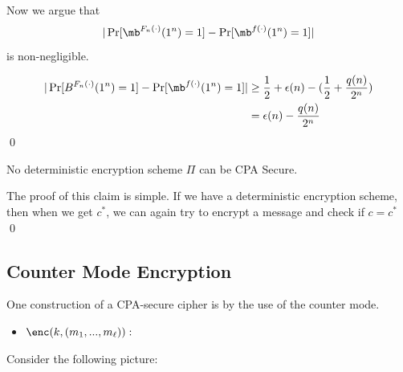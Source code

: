 Now we argue that 
$$|\Pr[\mb^{F_n(\cdot)}(1^n) = 1] - \Pr[\mb^{f(\cdot)}(1^n) = 1]|$$
is non-negligible.

\begin{align*}
    |\Pr[B^{F_n(\cdot)}(1^n) = 1] - \Pr[\mb^{f(\cdot)}(1^n) = 1]| &\ge \frac{1}{2} + \epsilon(n) - (\frac{1}{2} + \frac{q(n)}{2^n}) \\
    &= \epsilon(n) - \frac{q(n)}{2^n}
\end{align*}
\qed

\begin{theorem}
    No deterministic encryption scheme $\Pi$ can be CPA Secure.
\end{theorem}

\proof
The proof of this claim is simple.
If we have a deterministic encryption scheme, then when we get $c^*$, we can again try to encrypt a message and check if $c = c^*$
\qed


\subsection{Counter Mode Encryption}
One construction of a CPA-secure cipher is by the use of the counter mode.

\begin{itemize}
    \item $\enc(k, (m_1,...,m_\ell)):$
\end{itemize}

Consider the following picture:

\begin{center}
\end{center}


